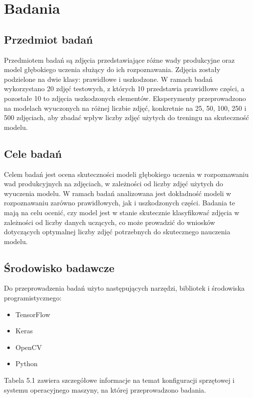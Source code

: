 \chapter{Badania}

\section{Przedmiot badań}
Przedmiotem badań są zdjęcia przedstawiające różne wady produkcyjne oraz model głębokiego uczenia służący do ich rozpoznawania. Zdjęcia zostały podzielone na dwie klasy: prawidłowe i uszkodzone. W ramach badań wykorzystano 20 zdjęć testowych, z których 10 przedstawia prawidłowe części, a pozostałe 10 to zdjęcia uszkodzonych elementów. Eksperymenty przeprowadzono na modelach wyuczonych na różnej liczbie zdjęć, konkretnie na 25, 50, 100, 250 i 500 zdjęciach, aby zbadać wpływ liczby zdjęć użytych do treningu na skuteczność modelu.

\section{Cele badań}
Celem badań jest ocena skuteczności modeli głębokiego uczenia w rozpoznawaniu wad produkcyjnych na zdjęciach, w zależności od liczby zdjęć użytych do wyuczenia modelu. W ramach badań analizowana jest dokładność modeli w rozpoznawaniu zarówno prawidłowych, jak i uszkodzonych części. Badania te mają na celu ocenić, czy model jest w stanie skutecznie klasyfikować zdjęcia w zależności od liczby danych uczących, co może prowadzić do wniosków dotyczących optymalnej liczby zdjęć potrzebnych do skutecznego nauczenia modelu.

\section{Środowisko badawcze}
Do przeprowadzenia badań użyto następujących narzędzi, bibliotek i środowiska programistycznego:
\begin{itemize}
    \item TensorFlow
    \item Keras
    \item OpenCV
    \item Python
\end{itemize}

Tabela 5.1 zawiera szczegółowe informacje na temat konfiguracji sprzętowej i systemu operacyjnego maszyny, na której przeprowadzono badania.

